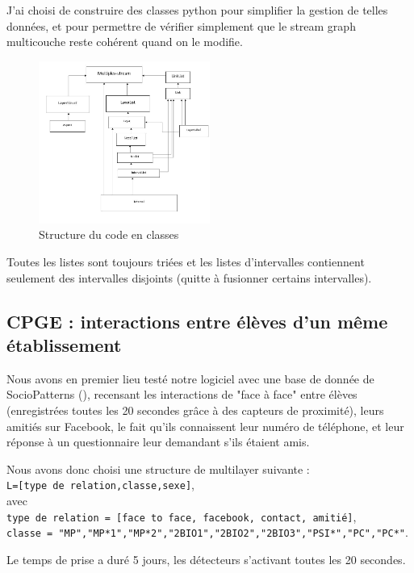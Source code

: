 \documentclass[11pt,a4paper]{article}
\theoremstyle{definition}
\theoremstyle{remark}
\theoremstyle{remark}
\begin{document}
	J'ai choisi de construire des classes python pour simplifier la gestion de telles données, et pour permettre de vérifier simplement que le stream graph multicouche reste cohérent quand on le modifie.
	
	
	
	\begin{figure}[H]
		\centering
		\includegraphics[width=0.5\textwidth]{codeStructure.JPG}
		\caption{Structure du code en classes }
	\end{figure}
	
	Toutes les listes sont toujours triées et les listes d'intervalles contiennent seulement des intervalles disjoints (quitte à fusionner certains intervalles).
	
	

\subsection{CPGE : interactions entre élèves d'un même établissement}

Nous avons en premier lieu testé notre logiciel avec une base de donnée de SocioPatterns (\cite{cpge}), recensant les interactions de "face à face" entre élèves (enregistrées toutes les 20 secondes grâce à des capteurs de proximité), leurs amitiés sur Facebook, le fait qu'ils connaissent leur numéro de téléphone, et leur réponse à un questionnaire leur demandant s'ils étaient amis.

Nous avons donc choisi une structure de multilayer suivante : \\
{\tt L=[type de relation,classe,sexe]},\\
 avec\\
  {\tt type de relation = [face to face, facebook, contact, amitié]},\\
  {\tt classe = "MP","MP*1","MP*2","2BIO1","2BIO2","2BIO3","PSI*","PC","PC*"}.
  
  Le temps de prise a duré 5 jours, les détecteurs s'activant toutes les 20 secondes.
  
\end{document}
